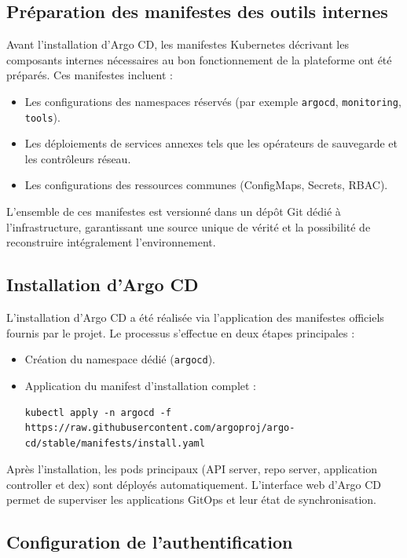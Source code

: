 \subsection{Préparation des manifestes des outils internes}

Avant l’installation d’Argo CD, les manifestes Kubernetes décrivant les composants internes nécessaires au bon fonctionnement de la plateforme ont été préparés.
Ces manifestes incluent :
\begin{itemize}
	\item Les configurations des namespaces réservés (par exemple \texttt{argocd}, \texttt{monitoring}, \texttt{tools}).
	\item Les déploiements de services annexes tels que les opérateurs de sauvegarde et les contrôleurs réseau.
	\item Les configurations des ressources communes (ConfigMaps, Secrets, RBAC).
\end{itemize}

L’ensemble de ces manifestes est versionné dans un dépôt Git dédié à l’infrastructure, garantissant une source unique de vérité et la possibilité de reconstruire intégralement l’environnement.

\subsection{Installation d’Argo CD}

L’installation d’Argo CD a été réalisée via l’application des manifestes officiels fournis par le projet.
Le processus s’effectue en deux étapes principales :
\begin{itemize}
	\item Création du namespace dédié (\texttt{argocd}).
	\item Application du manifest d’installation complet :
	      \begin{verbatim}
kubectl apply -n argocd -f https://raw.githubusercontent.com/argoproj/argo-cd/stable/manifests/install.yaml
\end{verbatim}
\end{itemize}

Après l’installation, les pods principaux (API server, repo server, application controller et dex) sont déployés automatiquement.
L’interface web d’Argo CD permet de superviser les applications GitOps et leur état de synchronisation.

\subsection{Configuration de l’authentification}

